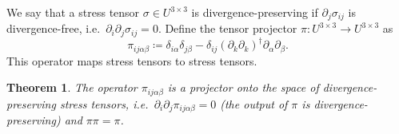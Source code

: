 \documentclass[preprint,twocolumn,5p]{elsarticle}
\newtheorem{theorem}{Theorem}
\begin{document}
We say that a stress tensor $\sigma \in U^{3 \times 3}$
is divergence-preserving if
$\partial_j \sigma_{i j}$ is divergence-free, i.e.\
$\partial_i \partial_j \sigma_{i j} = 0$.
Define the tensor projector $\pi : U^{3 \times 3} \to U^{3 \times 3}$ as
\begin{equation}
    \pi_{i j \alpha \beta} \coloneq \delta_{i \alpha} \delta_{j \beta} -
    \delta_{i j} \left( \partial_k \partial_k \right)^{\dagger}
    \partial_\alpha \partial_\beta.
\end{equation}
This operator maps stress tensors to stress tensors.

\begin{theorem} \label{th:stress-projector}
    The operator $\pi_{i j \alpha \beta}$ is a projector onto the space of
    divergence-preserving stress tensors, i.e.\
    $\partial_i \partial_j \pi_{i j \alpha \beta} = 0$
    (the output of $\pi$ is divergence-preserving) and
    $\pi \pi = \pi$.
\end{theorem}
\end{document}
